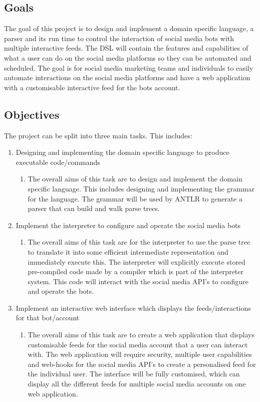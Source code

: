 \documentclass[chapterprefix=false]{scrreprt}
\begin{document}
\subsection{Goals}

The goal of this project is to design and implement a domain specific language, a parser and its run time to control the interaction of social media bots with multiple interactive feeds. The DSL will contain the features and capabilities of what a user can do on the social media platforms so they can be automated and scheduled. The goal is for social media marketing teams and individuals to easily automate interactions on the social media platforms and have a web application with a customisable interactive feed for the bots account.

\subsection{Objectives}

The project can be split into three main tasks. This includes:

 \begin{enumerate}
   \item Designing and implementing the domain specific language to produce executable code/commands
   \begin{enumerate}
	   	\item The overall aims of this task are to design and implement the domain specific language. This includes designing and implementing the grammar for the language. The grammar will be used by ANTLR to generate a parser that can build and walk parse trees.
   \end{enumerate}
   \item Implement the interpreter to configure and operate the social media bots
   \begin{enumerate}
	   	\item The overall aims of this task are for the interpreter to use the parse tree to translate it into some efficient intermediate representation and immediately execute this. The interpreter will explicitly execute stored pre-compiled code made by a compiler which is part of the interpreter system. This code will 			interact with the social media API’s to configure and operate the bots.
   \end{enumerate}
   \item Implement an interactive web interface which displays the feeds/interactions for that bot/account
      \begin{enumerate}
	   	\item The overall aims of this task are to create a web application that displays customisable feeds for the social media account that a user can interact with. The web application will require security, multiple user capabilities and web-hooks for the social media API’s to create a personalised feed for the individual user. The interface will be fully customised, which can display all the different feeds for multiple social media accounts on one web application.
   \end{enumerate}
 \end{enumerate}
 
\end{document}
